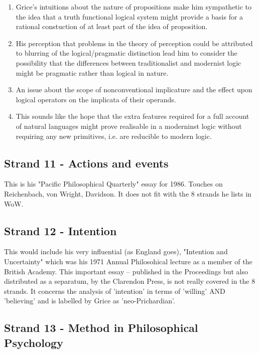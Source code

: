 \documentclass[10pt,titlepage]{book}
\begin{document}
\begin{enumerate}

\item Grice's intuitions about the nature of propositions make him sympathetic to the idea that a truth functional logical system might provide a basis for a rational constuction of at least part of the idea of proposition.

\item His perception that problems in the theory of perception could be attributed to blurring of the logical/pragmatic distinction lead him to consider the possibility that the differences between traditionalist and modernist logic might be pragmatic rather than logical in nature.

\item An issue about the scope of nonconventional implicature and the effect upon logical operators on the implicata of their operands.

\item This sounds like the hope that the extra features required for a full account of natural languages might prove realisable in a moderninst logic without requiring any new primitives, i.e. are reducible to modern logic.

\end{enumerate}

\subsection{Strand 11 - Actions and events}

This is his "Pacific Philosophical Quarterly" essay for 1986.
Touches on Reichenbach, von Wright, Davidson.
It does not fit with the 8 strands he lists in WoW.
 
\subsection{Strand 12 - Intention}

This would include his very influential (as England goes), "Intention and Uncertainty" which was his 1971 Annual Philosohical  
lecture as a member of the British Academy.
This important essay -- published in the Proceedings but also distributed as a separatum, by the Clarendon Press, is  not really covered in the 8 strands.
It concerns the analysis of 'intention' in terms of 'willing' AND 'believing' and is labelled by Grice as 'neo-Prichardian'.
 
\subsection{Strand 13 - Method in Philosophical Psychology}
\end{document}
